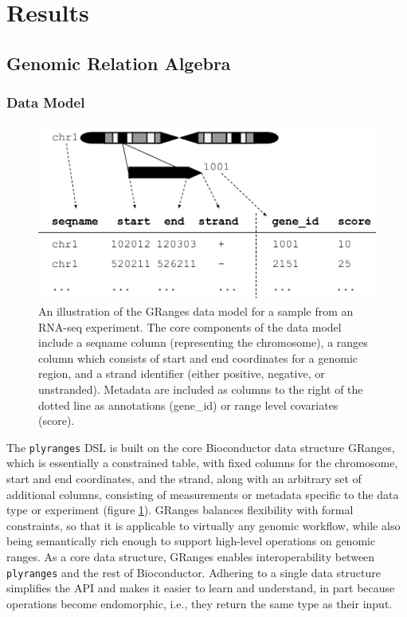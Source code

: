 \documentclass[]{article}
\begin{document}
\hypertarget{results}{%
\section{Results}\label{results}}

\hypertarget{genomic-relation-algebra}{%
\subsection{Genomic Relation Algebra}\label{genomic-relation-algebra}}

\hypertarget{data-model}{%
\subsubsection{Data Model}\label{data-model}}

\begin{figure}
\includegraphics[width=\textwidth]{diagrams/GRanges}
\caption{An illustration of the GRanges data model for a
sample from an RNA-seq experiment. The core components of the data model
include a seqname column (representing the chromosome), a ranges column
which consists of start and end coordinates for a genomic region, and a
strand identifier (either positive, negative, or unstranded). Metadata
are included as columns to the right of the dotted line as annotations
(gene\_id) or range level covariates (score).}
\label{fig:GRanges} 
\end{figure}

The \texttt{plyranges} DSL is built on the core Bioconductor data
structure GRanges, which is essentially a constrained table, with fixed
columns for the chromosome, start and end coordinates, and the strand,
along with an arbitrary set of additional columns, consisting of
measurements or metadata specific to the data type or experiment (figure
\ref{fig:GRanges}). GRanges balances flexibility with formal
constraints, so that it is applicable to virtually any genomic workflow,
while also being semantically rich enough to support high-level
operations on genomic ranges. As a core data structure, GRanges enables
interoperability between \texttt{plyranges} and the rest of
Bioconductor. Adhering to a single data structure simplifies the API and
makes it easier to learn and understand, in part because operations
become endomorphic, i.e., they return the same type as their input.
\end{document}
